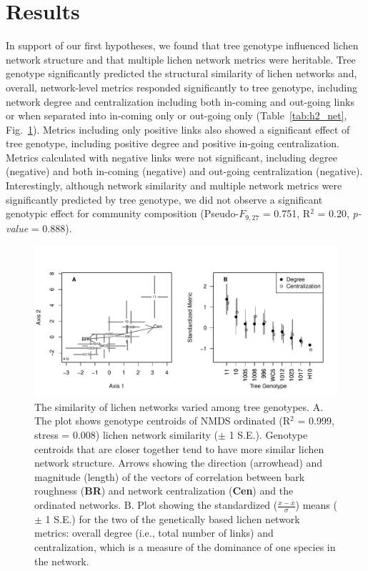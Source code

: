 \documentclass[fleqn,12pt]{olplainarticle}
\begin{document}
\section*{Results}

In support of our first hypotheses, we found that tree genotype
influenced lichen network structure and that multiple lichen network
metrics were heritable. Tree genotype significantly predicted the
structural similarity of lichen networks and, overall, network-level
metrics responded significantly to tree genotype, including network
degree and centralization including both in-coming and out-going links
or when separated into in-coming only or out-going only
(Table~\ref{tab:h2_net}, Fig.~\ref{fig:h2_plot}).  Metrics including
only positive links also showed a significant effect of tree genotype,
including positive degree and positive in-going centralization.
Metrics calculated with negative links were not significant, including
degree (negative) and both in-coming (negative) and out-going
centralization (negative). Interestingly, although network similarity
and multiple network metrics were significantly predicted by tree
genotype, we did not observe a significant genotypic effect for
community composition (Pseudo-$F_{9, 27}$ = 0.751, R$^2$ = 0.20,
\textit{p-value} = 0.888).

\begin{figure}[ht]
\centering
\includegraphics[width=\linewidth]{figures/h2_plot.pdf}
\caption{The similarity of lichen networks varied among tree
  genotypes. A. The plot shows genotype centroids of NMDS ordinated
  (R$^2$ = 0.999, stress = 0.008) lichen network similarity ($\pm$ 1
  S.E.). Genotype centroids that are closer together tend to have more
  similar lichen network structure. Arrows showing the direction
  (arrowhead) and magnitude (length) of the vectors of correlation
  between bark roughness (\textbf{BR}) and network centralization
  (\textbf{Cen}) and the ordinated networks. B. Plot showing
  the standardized ($\frac{x - \bar{x}}{\sigma}$) means ($\pm$ 1 S.E.)
  for the two of the genetically based lichen network metrics: overall
  degree (i.e., total number of links) and centralization, which is a
  measure of the dominance of one species in the network.}
\label{fig:h2_plot}
\end{figure}
\end{document}
